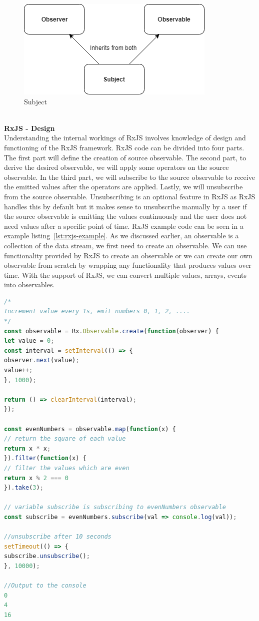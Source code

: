 \begin{figure}[!h]
	\centering
	\includegraphics[scale=0.5,trim=0 0 0 0]{images/subjects.png}
	\caption{Subject}
	\label{fig:subject-diagram}
\end{figure}

\leavevmode
\\
\textbf{RxJS - Design}
\\
Understanding the internal workings of RxJS involves knowledge of design and functioning of the RxJS framework. RxJS code can be divided into four parts. The first part will define the creation of source observable. The second part, to derive the desired observable, we will apply some operators on the source observable. In the third part, we will subscribe to the source observable to receive the emitted values after the operators are applied. Lastly, we will unsubscribe from the source observable. Unsubscribing is an optional feature in RxJS as RxJS handles this by default but it makes sense to unsubscribe manually by a user if the source observable is emitting the values continuously and the user does not need values after a specific point of time. RxJS example code can be seen in a example listing~\ref{lst:rxjs-example}. As we discussed earlier, an observable is a collection of the data stream, we first need to create an observable. We can use functionality provided by RxJS to create an observable or we can create our own observable from scratch by wrapping any functionality that produces values over time. With the support of RxJS, we can convert multiple values, arrays, events into observables. 

\begin{lstlisting}[language=JavaScript, caption=RxJS example, label={lst:rxjs-example}]
/*
Increment value every 1s, emit numbers 0, 1, 2, ....
*/
const observable = Rx.Observable.create(function(observer) {
let value = 0;
const interval = setInterval(() => {
observer.next(value);
value++;
}, 1000);

return () => clearInterval(interval);
});

const evenNumbers = observable.map(function(x) {
// return the square of each value
return x * x;
}).filter(function(x) {
// filter the values which are even
return x % 2 === 0
}).take(3);

// variable subscribe is subscribing to evenNumbers observable
const subscribe = evenNumbers.subscribe(val => console.log(val));

//unsubscribe after 10 seconds
setTimeout(() => {
subscribe.unsubscribe();
}, 10000);

//Output to the console
0
4
16
\end{lstlisting}

